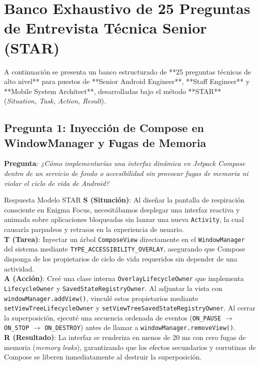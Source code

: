 \documentclass[11pt,a4paper,oneside]{report}
\begin{document}
\newpage

\chapter[25 Preguntas STAR de Entrevista]{Banco Exhaustivo de 25 Preguntas de Entrevista Técnica Senior (STAR)}

A continuación se presenta un banco estructurado de **25 preguntas técnicas de alto nivel** para puestos de **Senior Android Engineer**, **Staff Engineer** y **Mobile System Architect**, desarrolladas bajo el método **STAR** (\textit{Situation, Task, Action, Result}).

\section{Pregunta 1: Inyección de Compose en WindowManager y Fugas de Memoria}
\textbf{Pregunta}: \textit{¿Cómo implementarías una interfaz dinámica en Jetpack Compose dentro de un servicio de fondo o accesibilidad sin provocar fugas de memoria ni violar el ciclo de vida de Android?}

\begin{starbox}{Respuesta Modelo STAR}
\textbf{\color{starSituation}S (Situación)}: Al diseñar la pantalla de respiración consciente en Enigma Focus, necesitábamos desplegar una interfaz reactiva y animada sobre aplicaciones bloqueadas sin lanzar una nueva \texttt{Activity}, la cual causaría parpadeos y retrasos en la experiencia de usuario.\\[0.15cm]
\textbf{\color{starTask}T (Tarea)}: Inyectar un árbol \texttt{ComposeView} directamente en el \texttt{WindowManager} del sistema mediante \texttt{TYPE\_ACCESSIBILITY\_OVERLAY}, asegurando que Compose disponga de los propietarios de ciclo de vida requeridos sin depender de una actividad.\\[0.15cm]
\textbf{\color{starAction}A (Acción)}: Creé una clase interna \texttt{OverlayLifecycleOwner} que implementa \texttt{LifecycleOwner} y \texttt{SavedStateRegistryOwner}. Al adjuntar la vista con \texttt{windowManager.addView()}, vinculé estos propietarios mediante \texttt{setViewTreeLifecycleOwner} y \texttt{setViewTreeSavedStateRegistryOwner}. Al cerrar la superposición, ejecuté una secuencia ordenada de eventos (\texttt{ON\_PAUSE} $\rightarrow$ \texttt{ON\_STOP} $\rightarrow$ \texttt{ON\_DESTROY}) antes de llamar a \texttt{windowManager.removeView()}.\\[0.15cm]
\textbf{\color{starResult}R (Resultado)}: La interfaz se renderiza en menos de 20 ms con cero fugas de memoria (\textit{memory leaks}), garantizando que los efectos secundarios y corrutinas de Compose se liberen inmediatamente al destruir la superposición.
\end{starbox}
\end{document}
